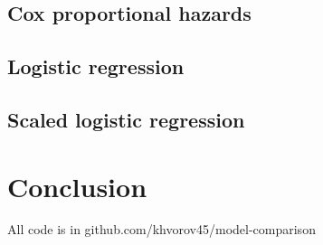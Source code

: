 \documentclass[12pt]{article}
\begin{document}
\subsection{Cox proportional hazards}



\subsection{Logistic regression}

\subsection{Scaled logistic regression}

\section{Conclusion}



\pagebreak

All code is in github.com/khvorov45/model-comparison
\end{document}

